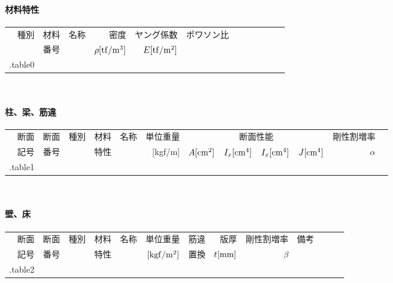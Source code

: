 \paragraph{材料特性}
{\footnotesize
\begin{tabular}{r r r r r r r r r r r r} \toprule
    種別 & 材料 & 名称 & 密度 & ヤング係数 & ポワソン比 \\
         & 番号 &      & $\rho{\rm [tf/m^3]}$ & $E {\rm [tf/m^2]}$ & \\ \midrule
{{.table0}}
\end{tabular}\\}

\paragraph{柱、梁、筋違}
{\footnotesize
\begin{tabular}{r r r r r r r r r r r r} \toprule
    断面 & 断面 & 種別 & 材料 & 名称 & 単位重量 & \multicolumn{4}{c}{断面性能} & 剛性割増率 \\
    記号 & 番号 &      & 特性 & & [kgf/m] & $A{\rm [cm^2]}$ & $I_x {\rm [cm^4]}$ & $I_x {\rm [cm^4]}$ & $J {\rm [cm^4]}$ & $\alpha$ \\ \midrule
{{.table1}}
\end{tabular}\\}

\paragraph{壁、床}
{\footnotesize
\begin{tabular}{r r r r r r r r r r r r r} \toprule
    断面 & 断面 & 種別 & 材料 & 名称 & 単位重量 & 筋違 & 版厚 & 剛性割増率 & 備考\\
    記号 & 番号 &      & 特性 &    & ${\rm [kgf/m^2]}$ & 置換 & $t{\rm [mm]}$ & $\beta$ & \\ \midrule
{{.table2}}
\end{tabular}\\
}
\newpage
